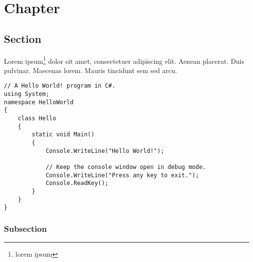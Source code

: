\chapter{Chapter}

\section{Section}

Lorem ipsum\footnote{lorem ipsum} dolor sit amet, consectetuer adipiscing elit. Aenean placerat. Duis pulvinar. Maecenas lorem. Mauris tincidunt sem sed arcu.

\begin{lstlisting}[caption=C\# code]
// A Hello World! program in C#.
using System;
namespace HelloWorld
{
    class Hello 
    {
        static void Main() 
        {
            Console.WriteLine("Hello World!");

            // Keep the console window open in debug mode.
            Console.WriteLine("Press any key to exit.");
            Console.ReadKey();
        }
    }
}
\end{lstlisting}

\subsection{Subsection}


